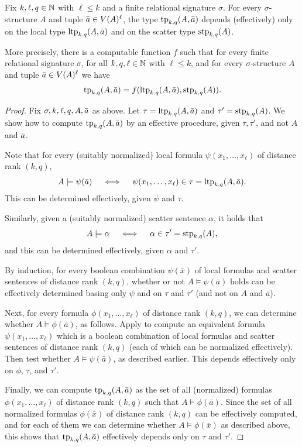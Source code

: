 \begin{theorem}\label{thm:localglobal'}
    Fix $k,\ell,q\in\mathbb N$ with $\ell\le k$
    and a finite relational signature $\sigma$.
For every $\sigma$-structure $A$ and tuple $\bar a\in V(A)^\ell$,
the type $\textnormal{tp}_{k,q}(A,\bar a)$ depends (effectively) only 
on the local type $\textnormal{ltp}_{k,q}(A,\bar a)$ and on the scatter type $\textnormal{stp}_{k,q}(A)$.

More precisely, there is a computable function $f$ 
such that for every finite relational signature $\sigma$, for all $k,q,\ell\in\mathbb N$ with $\ell\le k$, and for every $\sigma$-structure $A$ and tuple $\bar a\in V(A)^\ell$ we have
$$\textnormal{tp}_{k,q}(A,\bar a)=f(\textnormal{ltp}_{k,q}(A,\bar a), \textnormal{stp}_{k,q}(A)).$$
\end{theorem}
\begin{proof}
Fix $\sigma,k,\ell,q, A,\bar a$ as above.
Let $\tau=\textnormal{ltp}_{k,q}(A, \bar a)$ and $\tau'=\textnormal{stp}_{k,q}(A)$.
We show how to compute $\textnormal{tp}_{k,q}(A,\bar a)$ by an effective procedure, given $\tau,\tau'$, and not  $A$ and $\bar a$.

Note that for every (suitably normalized) local \distFO formula $\psi(x_1,\ldots,x_\ell)$ of distance rank $(k,q)$,
 $$A\models \psi(\bar a)\quad\iff\quad \psi(x_1,\ldots,x_\ell)\in \tau=\textnormal{ltp}_{k,q}(A,\bar a).$$ 
  This can be determined effectively, given $\psi$ and $\tau$.

  Similarly, given a (suitably normalized) scatter sentence $\alpha$, 
  it holds that 
  $$A\models \alpha\quad\iff\quad \alpha\in \tau'= \textnormal{stp}_{k,q}(A),$$ 
  and this can be determined effectively, given $\alpha$ and $\tau'$.

By induction, 
for every boolean combination $\psi(\bar x)$
of local \distFO formulas and scatter sentences of distance rank $(k,q)$,
whether or not $A\models \psi(\bar a)$ holds can be effectively determined basing only $\psi$ and on $\tau$ and $\tau'$ (and not on $A$ and $\bar a$).

    Next, for every \distFO formula $\phi(x_1,\ldots,x_\ell)$ of distance rank $(k,q)$, we can determine 
    whether $A\models\phi(\bar a)$, as follows. 
Apply  to compute an equivalent formula $\psi(x_1,\ldots,x_\ell)$ which is a boolean combination 
of local \distFO formulas and scatter sentences of distance rank $(k,q)$
(each of which can be normalized effectively).
Then test whether $A\models \psi(\bar a)$, as described earlier.
This depends effectively only on $\phi$, $\tau$, and $\tau'$.

Finally, we can compute $\textnormal{tp}_{k,q}(A,\bar a)$ as the set of all (normalized) \distFO formulas $\phi(x_1,\ldots,x_\ell)$ of distance rank $(k,q)$ such that $A\models\phi(\bar a)$.
Since the set of all normalized \distFO formulas $\phi(\bar x)$ of distance rank $(k,q)$ can be effectively computed, and for each of them we can determine whether $A\models\phi(\bar x)$ as described above,
this shows that $\textnormal{tp}_{k,q}(A,\bar a)$ effectively depends only on $\tau$ and $\tau'$.
\end{proof}

